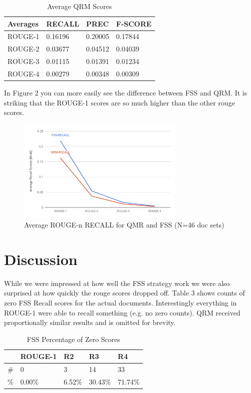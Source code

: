 \documentclass[11pt,a4paper]{article}
\begin{document}
\begin{table}[h]
\centering
\caption{Average QRM Scores}
\label{table2}
\begin{tabular}{|l|l|l|l|}
\hline
Averages & RECALL  & PREC    & F-SCORE \\ \hline
ROUGE-1  & 0.16196 & 0.20005 & 0.17844 \\ \hline
ROUGE-2  & 0.03677 & 0.04512 & 0.04039 \\ \hline
ROUGE-3  & 0.01115 & 0.01391 & 0.01234 \\ \hline
ROUGE-4  & 0.00279 & 0.00348 & 0.00309 \\ \hline
\end{tabular}
\end{table}

In Figure 2 you can more easily see the difference between FSS and QRM. It is striking that the ROUGE-1 scores are so much higher than the other rouge scores.

\begin{figure}
\caption{Average ROUGE-n RECALL for QMR and FSS (N=46 doc sets)}
\includegraphics[width=80mm,scale=0.5]{rouge_graph.png}
\end{figure}

\section{Discussion}
While we were impressed at how well the FSS strategy work we were also surprised at how quickly the rouge scores dropped off. Table 3 shows counts of zero FSS Recall scores for the actual documents. Interestingly everything in ROUGE-1 were able to recall something (e.g. no zero counts). QRM received proportionally similar results and is omitted for brevity.

\begin{table}[h]
\centering
\caption{FSS Percentage of Zero Scores}
\label{table3}
\begin{tabular}{|l|l|l|l|l|}
\hline
& ROUGE-1 & R2 & R3 & R4 \\ \hline
\#    & 0       & 3       & 14      & 33      \\ \hline
\%   & 0.00\%  & 6.52\%  & 30.43\% & 71.74\% \\ \hline
\end{tabular}
\end{table}
\end{document}
